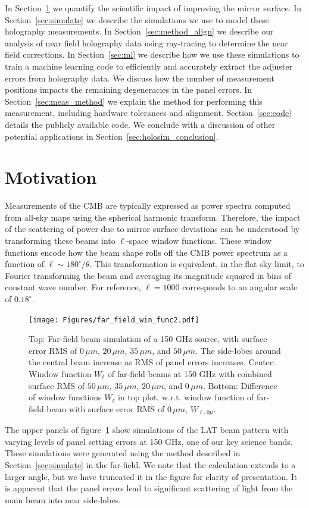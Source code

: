 In Section~\ref{sec:motive} we quantify the scientific impact of improving the mirror surface.  In Section~\ref{sec:simulate} we describe the simulations we use to model these holography measurements.  In Section~\ref{sec:method_align} we describe our analysis of near field holography data using ray-tracing to determine the near field corrections.  In Section~\ref{sec:ml} we describe how we use these simulations to train a machine learning code to efficiently and accurately extract the adjuster errors from holography data.  We discuss how the number of measurement positions impacts the remaining degeneracies in the panel errors.  In Section~\ref{sec:meas_method} we explain the method for performing this measurement, including hardware tolerances and alignment.  Section~\ref{sec:code} details the publicly available code.  We conclude with a discussion of other potential applications in Section~\ref{sec:holosim_conclusion}.  
\section{Motivation}
\label{sec:motive}

Measurements of the CMB are typically expressed as power spectra computed from all-sky maps using the spherical harmonic transform.  Therefore, the impact of the scattering of power due to mirror surface deviations can be understood by transforming these beams into $\ell$-space window functions.  These window functions encode how the beam shape rolls off the CMB power spectrum as a function of $\ell \sim 180^\circ / \theta$.  This transformation is equivalent, in the flat sky limit, to Fourier transforming the beam and averaging its magnitude squared in bins of constant wave number.  For reference, $\ell = 1000$ corresponds to an angular scale of $0.18^\circ$.

\begin{figure}[t]
    \centering
    \texttt{[image: Figures/far\_field\_win\_func2.pdf]}
    \caption{Top: Far-field beam simulation of a 150 GHz source, with surface error RMS of $0\,\mu m$, $20\,\mu m$, $35\,\mu m$, and $50\,\mu m$. The side-lobes around the central beam increase as RMS of panel errors increases. Center: Window function $W_\ell$ of far-field beams at 150 GHz with combined surface RMS of $50\,\mu m$, $35\,\mu m$, $20\,\mu m$, and $0\,\mu m$. Bottom: Difference of window functions $W_\ell$ in top plot, w.r.t. window function of far-field beam with surface error RMS of $0\,\mu m$, $W_{\ell,0\mu}$.}
    \label{fig:win_func}
\end{figure}
The upper panels of figure~\ref{fig:win_func} show simulations of the LAT beam pattern with varying levels of panel setting errors at 150 GHz, one of our key science bands.  These simulations were generated using the method described in Section~\ref{sec:simulate} in the far-field.  We note that the calculation extends to a larger angle, but we have truncated it in the figure for clarity of presentation.  It is apparent that the panel errors lead to significant scattering of light from the main beam into near side-lobes.

